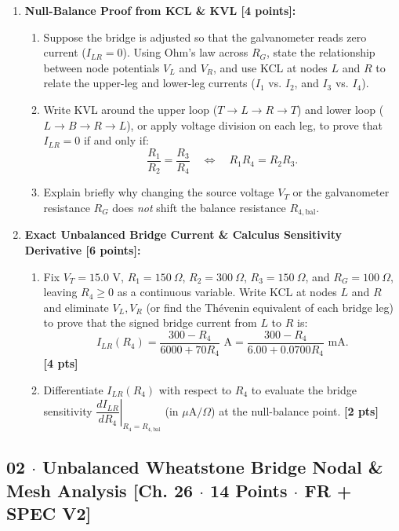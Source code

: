 \documentclass[10pt,letterpaper]{article}
\begin{document}
\begin{enumerate}
  \item \textbf{Null-Balance Proof from KCL \& KVL [4 points]:}
    \begin{enumerate}
      \item Suppose the bridge is adjusted so that the galvanometer reads zero current ($I_{LR} = 0$). Using Ohm's law across $R_G$, state the relationship between node potentials $V_L$ and $V_R$, and use KCL at nodes $L$ and $R$ to relate the upper-leg and lower-leg currents ($I_1$ vs. $I_2$, and $I_3$ vs. $I_4$).
      \item Write KVL around the upper loop ($T \to L \to R \to T$) and lower loop ($L \to B \to R \to L$), or apply voltage division on each leg, to prove that $I_{LR} = 0$ if and only if:
      $$\frac{R_1}{R_2} = \frac{R_3}{R_4} \quad \Longleftrightarrow \quad R_1 R_4 = R_2 R_3.$$
      \item Explain briefly why changing the source voltage $V_T$ or the galvanometer resistance $R_G$ does \emph{not} shift the balance resistance $R_{4,\text{bal}}$.
    \end{enumerate}
  
  \item \textbf{Exact Unbalanced Bridge Current \& Calculus Sensitivity Derivative [6 points]:}
    \begin{enumerate}
      \item Fix $V_T = 15.0\text{ V}$, $R_1 = 150\ \Omega$, $R_2 = 300\ \Omega$, $R_3 = 150\ \Omega$, and $R_G = 100\ \Omega$, leaving $R_4 \ge 0$ as a continuous variable. Write KCL at nodes $L$ and $R$ and eliminate $V_L, V_R$ (or find the Th\'evenin equivalent of each bridge leg) to prove that the signed bridge current from $L$ to $R$ is:
      $$I_{LR}(R_4) = \frac{300 - R_4}{6000 + 70 R_4}\text{ A} = \frac{300 - R_4}{6.00 + 0.0700 R_4}\text{ mA}.$$ \textbf{[4 pts]}
      \item Differentiate $I_{LR}(R_4)$ with respect to $R_4$ to evaluate the bridge sensitivity $\left.\dfrac{dI_{LR}}{dR_4}\right|_{R_4 = R_{4,\text{bal}}}$ (in $\mu\text{A}/\Omega$) at the null-balance point. \textbf{[2 pts]}
    \end{enumerate}
  
\end{enumerate}
\vspace{1.2in}


\newpage



\subsection*{02 $\cdot$ Unbalanced Wheatstone Bridge Nodal \& Mesh Analysis \hfill [Ch. 26 $\cdot$ 14 Points $\cdot$ FR + SPEC V2]}
\end{document}
